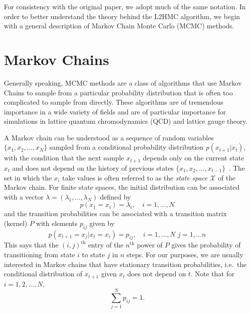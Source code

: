 \documentclass[../main.tex]{subfiles}
\begin{document}
For consistency with the original paper, we adopt much of the same notation.
%
In order to better understand the theory behind the L2HMC algorithm, we begin
with a general description of Markov Chain Monte Carlo (MCMC) methods.
%
\section{Markov Chains}
Generally speaking, MCMC methods are a class of algorithms that use Markov
Chains to sample from a particular probability distribution that is often too
complicated to sample from directly.
%
These algorithms are of tremendous importance in a wide variety of fields and
are of particular importance for simulations in lattice quantum chromodynamics
(QCD) and lattice gauge theory.

A Markov chain can be understood as a sequence of random variables ${\{x_1,
x_2, \ldots, x_N\}}$ sampled from a conditional probability distribution
$p{(x_{t+1}|x_t)}$, with the condition that the next sample $x_{t+1}$ depends
only on the current state $x_t$ and does not depend on the history of previous
states ${\{x_1, x_2, \ldots, x_{t-1}\}}$~\cite{brooks2011handbook}.
%
The set in which the $x_i$ take values is often referred to as the \emph{state
space} $\mathcal{X}$ of the Markov chain.
%
For finite state spaces, the initial distribution can be associated with a
vector $\lambda= {(\lambda_1, \ldots, \lambda_N)}$ defined by
%
\begin{equation}
  p(x_1 = x_i) = \lambda_i, \quad i = 1, \ldots, N
\end{equation}
%
and the transition probabilities can be associated with a transition matrix
(kernel) $P$ with elements $p_{ij}$ given by 
\begin{equation}
  p(x_{t+1} = x_j | x_t = x_i) = p_{ij}, \quad i = 1, \ldots, N \,\, j = 1,
\ldots n \end{equation}
This says that the ${(i, j)}^{\mathrm{th}}$ entry of the $n^{\mathrm{th}}$
power of $P$ gives the probability of transitioning from state $i$ to state $j$
in $n$ steps.
%
For our purposes, we are usually interested in Markov chains that have
stationary transition probabilities, i.e.\ the conditional distribution of
$x_{t+1}$ given $x_t$ does not depend on $t$. Note that for $i = 1, 2, \ldots,
N$,
\begin{equation}
  \sum_{j=1}^{N} p_{ij} = 1.
\end{equation}
\end{document}
